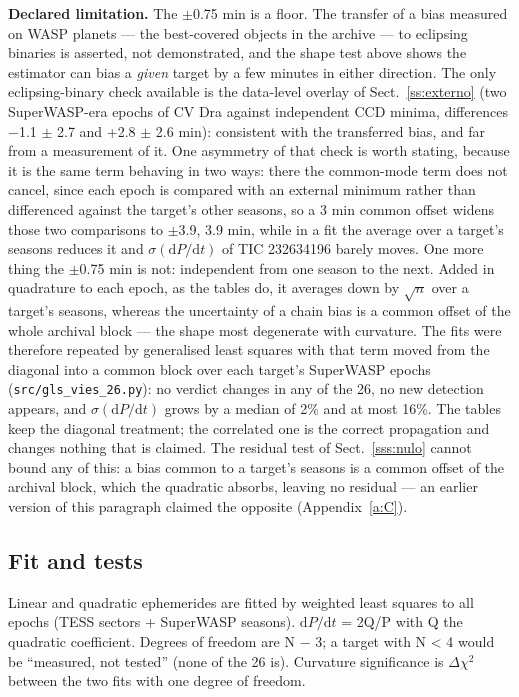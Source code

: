 \documentclass{aa}
\begin{document}
\textbf{Declared limitation.} The $\pm$0.75 min is a floor. The transfer of a bias measured on WASP planets --- the best-covered objects in the archive --- to eclipsing binaries is asserted, not demonstrated, and the shape test above shows the estimator can bias a \textit{given} target by a few minutes in either direction. The only eclipsing-binary check available is the data-level overlay of Sect.~\ref{ss:externo} (two SuperWASP-era epochs of CV Dra against independent CCD minima, differences $-$1.1 $\pm$ 2.7 and +2.8 $\pm$ 2.6 min): consistent with the transferred bias, and far from a measurement of it. One asymmetry of that check is worth stating, because it is the same term behaving in two ways: there the common-mode term does not cancel, since each epoch is compared with an external minimum rather than differenced against the target's other seasons, so a 3 min common offset widens those two comparisons to $\pm$3.9, 3.9 min, while in a fit the average over a target's seasons reduces it and $\sigma(\mathrm{d}P/\mathrm{d}t)$ of TIC 232634196 barely moves. One more thing the $\pm$0.75 min is not: independent from one season to the next. Added in quadrature to each epoch, as the tables do, it averages down by $\sqrt{n}$ over a target's seasons, whereas the uncertainty of a chain bias is a common offset of the whole archival block --- the shape most degenerate with curvature. The fits were therefore repeated by generalised least squares with that term moved from the diagonal into a common block over each target's SuperWASP epochs (\texttt{src/\allowbreak gls\_\allowbreak vies\_\allowbreak 26.py}): no verdict changes in any of the 26, no new detection appears, and $\sigma(\mathrm{d}P/\mathrm{d}t)$ grows by a median of 2\% and at most 16\%. The tables keep the diagonal treatment; the correlated one is the correct propagation and changes nothing that is claimed. The residual test of Sect.~\ref{sss:nulo} cannot bound any of this: a bias common to a target's seasons is a common offset of the archival block, which the quadratic absorbs, leaving no residual --- an earlier version of this paragraph claimed the opposite (Appendix~\ref{a:C}).


\subsection{Fit and tests}\label{ss:testes}
Linear and quadratic ephemerides are fitted by weighted least squares to all epochs (TESS sectors + SuperWASP seasons). $\mathrm{d}P/\mathrm{d}t$ = 2Q/P with Q the quadratic coefficient. Degrees of freedom are N $-$ 3; a target with N < 4 would be ``measured, not tested'' (none of the 26 is). Curvature significance is $\Delta\chi^2$ between the two fits with one degree of freedom.
\end{document}
